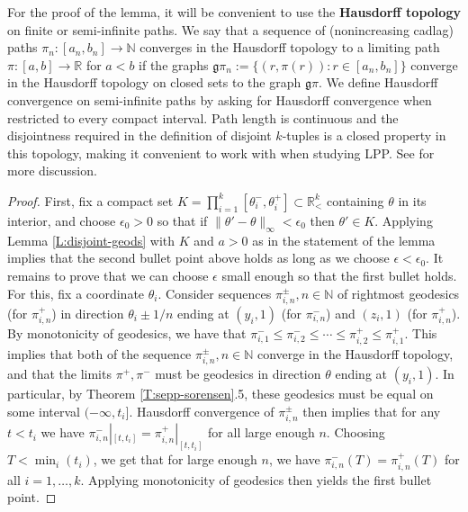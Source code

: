 \documentclass[11pt]{article}
\newcommand{\N}{\mathbb{N}}
\newcommand{\R}{\mathbb{R}}
\newcommand{\ep}{\epsilon}
\theoremstyle{definition} %
\theoremstyle{remark} %
\begin{document}
For the proof of the lemma, it will be convenient to use the \textbf{Hausdorff topology} on finite or semi-infinite paths. We say that a sequence of (nonincreasing cadlag) paths $\pi_n:[a_n, b_n] \to \N$ converges in the Hausdorff topology to a limiting path $\pi:[a, b] \to \R$ for $a < b$ if the graphs $\mathfrak g \pi_n := \{(r, \pi(r)) : r \in [a_n, b_n]\}$ converge in the Hausdorff topology on closed sets to the graph $\mathfrak g \pi$. We define Hausdorff convergence on semi-infinite paths by asking for Hausdorff convergence when restricted to every compact interval.
Path length is continuous and the disjointness required in the definition of disjoint $k$-tuples is a closed property in this topology, making it convenient to work with when studying LPP. See \cite[Section 2.3]{dauvergne2022rsk} for more discussion.

\begin{proof}
First, fix a compact set  $K = \prod_{i=1}^k [\theta_i^-, \theta_i^+]\subset \R^k_<$ containing $\theta$ in its interior, and choose $\ep_0 > 0$ so that if $\|\theta' - \theta\|_\infty < \ep_0$ then $\theta' \in K$. Applying Lemma \ref{L:disjoint-geods} with $K$ and $a > 0$ as in the statement of the lemma implies that the second bullet point above holds as long as we choose $\ep < \ep_0$. It remains to prove that we can choose $\ep$ small enough so that the first bullet holds. For this, fix a coordinate $\theta_i$. Consider sequences $\pi_{i,n}^\pm, n \in \N$ of rightmost geodesics (for $\pi_{i, n}^+$) in direction $\theta_i \pm 1/n$ ending at $(y_i, 1)$ (for $\pi_{i, n}^-$) and $(z_i, 1)$ (for $\pi_{i, n}^+$). By monotonicity of geodesics, we have that $\pi_{i, 1}^- \le \pi_{i, 2}^- \le \cdots \le \pi_{i, 2}^+ \le \pi_{i, 1}^+$. This implies that both of the sequence $\pi_{i, n}^\pm, n \in \N$ converge in the Hausdorff topology, and that the limits $\pi^+, \pi^-$ must be geodesics in direction $\theta$ ending at $(y_i, 1)$. In particular, by Theorem \ref{T:sepp-sorensen}.5, these geodesics must be equal on some interval $(-\infty, t_i]$. Hausdorff convergence of $\pi_{i, n}^\pm$ then implies that for any $t < t_i$ we have $\pi_{i, n}^-|_{[t, t_i]} = \pi_{i, n}^+|_{[t, t_i]}$ for all large enough $n$. Choosing $T < \min_i (t_i)$, we get that for large enough $n$, we have $\pi_{i, n}^-(T) = \pi_{i, n}^+(T)$ for all $i = 1, \dots, k$. Applying monotonicity of geodesics then yields the first bullet point.
\end{proof}
	
\end{document}
